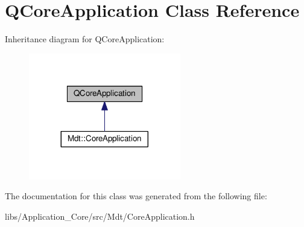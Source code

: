 \hypertarget{class_q_core_application}{}\section{Q\+Core\+Application Class Reference}
\label{class_q_core_application}


Inheritance diagram for Q\+Core\+Application\+:
\nopagebreak
\begin{figure}[H]
\begin{center}
\leavevmode
\includegraphics[width=188pt]{class_q_core_application__inherit__graph}
\end{center}
\end{figure}


The documentation for this class was generated from the following file\+:\begin{DoxyCompactItemize}
\item 
libs/\+Application\+\_\+\+Core/src/\+Mdt/Core\+Application.\+h\end{DoxyCompactItemize}
